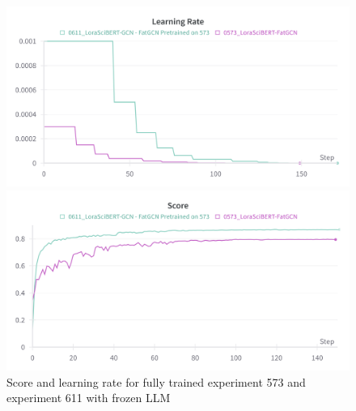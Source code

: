 \begin{figure}
\centering
\begin{minipage}{0.4\textwidth}
\includegraphics[width=\textwidth]{figures/611_lr.png}
\end{minipage}
\hfill
\begin{minipage}{0.4\textwidth}
\includegraphics[width=\textwidth]{figures/611_score.png}   
\end{minipage}
\caption{Score and learning rate for fully trained experiment 573 and experiment 611 with frozen LLM}
\label{fig:611}
\end{figure}


